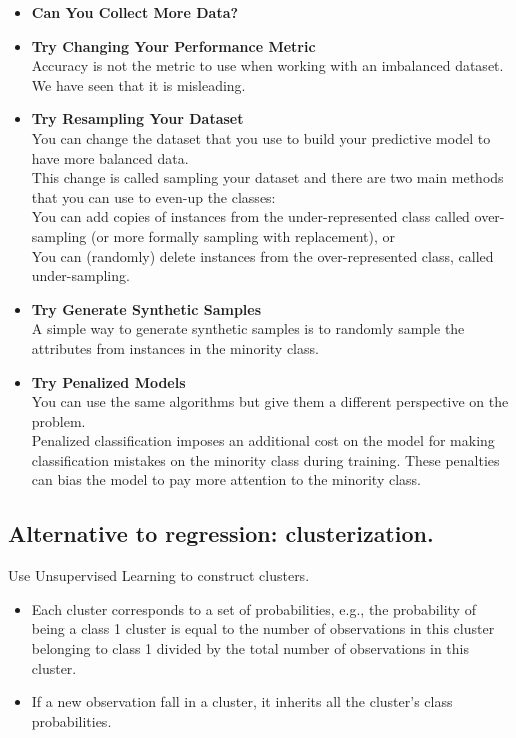 \begin{itemize}
    \item \textbf{Can You Collect More Data?}
    \item \textbf{Try Changing Your Performance Metric}\\
    Accuracy is not the metric to use when working with an imbalanced dataset. We have seen that it is misleading.
    \item \textbf{Try Resampling Your Dataset}\\
    You can change the dataset that you use to build your predictive model to have more balanced data.\\
    This change is called sampling your dataset and there are two main methods that you can use to even-up the classes:\\
    You can add copies of instances from the under-represented class called over-sampling (or more formally sampling with replacement), or\\
    You can (randomly) delete instances from the over-represented class, called under-sampling.
    \item \textbf{Try Generate Synthetic Samples}\\
    A simple way to generate synthetic samples is to randomly sample the attributes from instances in the minority class.
    \item \textbf{Try Penalized Models}\\
    You can use the same algorithms but give them a different perspective on the problem.\\
    Penalized classification imposes an additional cost on the model for making classification mistakes on the minority class during training. These penalties can bias the model to pay more attention to the minority class.
\end{itemize}

\subsection{Alternative to regression: clusterization.}

Use Unsupervised Learning to construct clusters.
\begin{itemize}
    \item Each cluster corresponds to a set of probabilities, e.g., the probability of being a class 1 cluster is equal to the number of observations in this cluster belonging to class 1 divided by the total number of observations in this cluster.
    \item If a new observation fall in a cluster, it inherits all the cluster's class probabilities.
\end{itemize}

